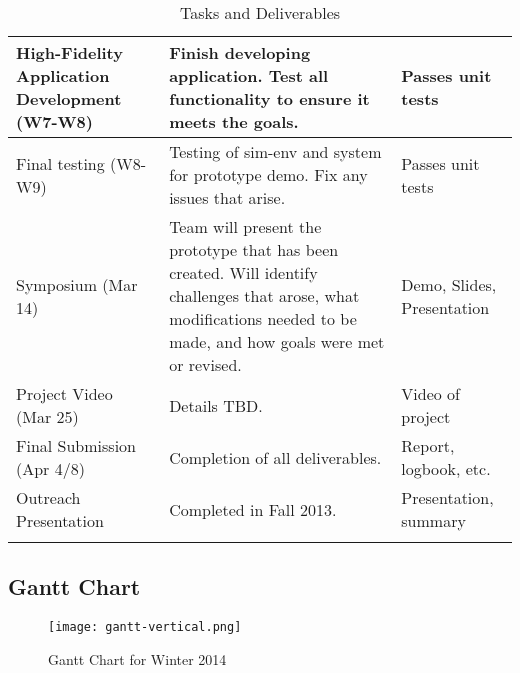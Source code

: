 \documentclass{article}
\begin{document}
\begin{longtable}{|p{4.5cm}|p{6cm}|p{4.5cm}|}
    High-Fidelity Application Development (W7-W8)     & Finish developing application. Test all functionality to ensure it meets the goals.                                                                                                                                                & Passes unit tests                     \\ \hline
    Final testing (W8-W9)                             & Testing of sim-env and system for prototype demo. Fix any issues that arise.                                                                                                                                                       & Passes unit tests                     \\ \hline
    Symposium (Mar 14)                                & Team will present the prototype that has been created. Will identify challenges that arose, what modifications needed to be made, and how goals were met or revised.                                                               & Demo, Slides, Presentation            \\ \hline
    Project Video (Mar 25)                            & Details TBD.                                                                                                                                                                                                                       & Video of project                      \\ \hline
    Final Submission (Apr 4/8)                        & Completion of all deliverables.                                                                                                                                                                                                    & Report, logbook, etc.                 \\ \hline
    Outreach Presentation                             & Completed in Fall 2013.                                                                                                                                                                                                            & Presentation, summary                 \\ \hline
\caption{Tasks and Deliverables}
\label{table:tasks-deliverables}
\end{longtable}

\newpage
\subsection{Gantt Chart}
\begin{figure}[htbp!]
  \begin{centering}
    \texttt{[image: gantt-vertical.png]}
    \caption{Gantt Chart for Winter 2014}
    \label{fig:gantt}
  \end{centering}
\end{figure}
\end{document}
